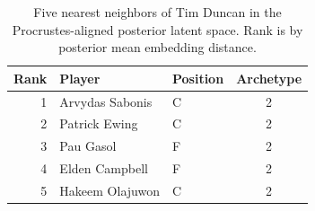 \begin{table}[htbp]
  \centering\small
  \begin{tabular}{rllc}
    \toprule
    Rank & Player & Position & Archetype \\
    \midrule
    1 & Arvydas Sabonis & C & 2 \\
    2 & Patrick Ewing & C & 2 \\
    3 & Pau Gasol & F & 2 \\
    4 & Elden Campbell & F & 2 \\
    5 & Hakeem Olajuwon & C & 2 \\
    \bottomrule
  \end{tabular}
  \caption{Five nearest neighbors of Tim Duncan in the Procrustes-aligned posterior latent space. Rank is by posterior mean embedding distance.}
  \label{tab:Tim_Duncan_neighbors}
\end{table}

